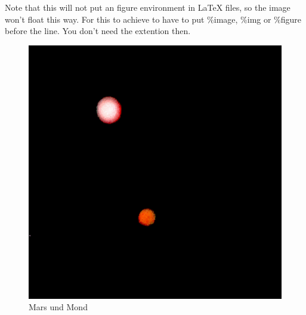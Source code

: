 \documentclass{scrartcl}
\begin{document}
Note that this will not put an figure environment in LaTeX
files, so the image won't float this way. For this to
achieve to have to put \%image, \%img or \%figure before the
line. You don't need the extention then.

\begin{figure}[hbt]
\includegraphics[height=.20\textheight]{Image}
\caption{Mars und Mond}
\end{figure}
\end{document}
